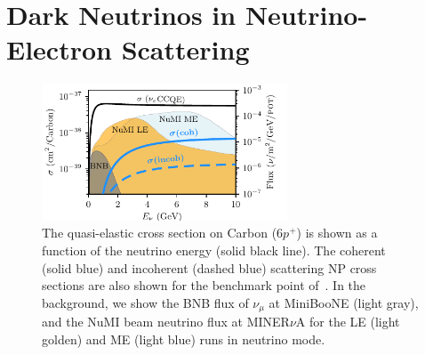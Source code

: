 \section{Dark Neutrinos in Neutrino-Electron Scattering}
\begin{figure}[t!]
    \centering
    \includegraphics[width=0.65\textwidth]{cross_sections.pdf}
    \caption[Upscattering total cross section.]{The quasi-elastic cross section on Carbon ($6p^+$) is shown as a function of the neutrino energy (solid black line). The coherent (solid blue) and incoherent (dashed blue) scattering NP cross sections are also shown for the benchmark point of~\cite{Bertuzzo:2018itn}. In the background, we show the BNB flux of $\nu_\mu$ at MiniBooNE (light gray), and the NuMI beam neutrino flux at MINER$\nu$A for the LE (light golden) and ME (light blue) runs in neutrino mode.\label{fig:cross_section}}
\end{figure}

